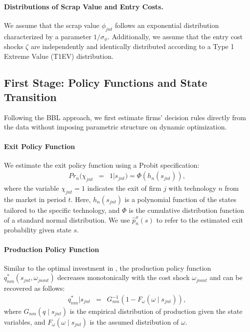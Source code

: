 \documentclass[12pt]{article}
\begin{document}
\paragraph{Distributions of Scrap Value and Entry Costs.} 
We assume that the scrap value $\phi_{jnt}$ follows an exponential distribution characterized by a parameter $1/\sigma_{\phi}$. %
Additionally, we assume that the entry cost shocks $\zeta$ are independently and identically distributed according to a Type 1 Extreme Value (T1EV) distribution.

\subsection{First Stage: Policy Functions and State Transition}
\label{subsec:est_dynamic_first}
Following the BBL approach, we first estimate firms’ decision rules directly from the data without imposing parametric structure on dynamic optimization.

\paragraph{Exit Policy Function} 
We estimate the exit policy function using a Probit specification:
\begin{eqnarray}
     Pr_n(\chi_{jnt} &=&1|s_{jnt})=\Phi(h_n(s_{jnt})), \label{eq:est_exit}
\end{eqnarray}
where the variable $\chi_{jnt}=1$ indicates the exit of firm $j$ with technology $n$ from the market in period $t$. Here, $h_n(s_{jnt})$ is a polynomial function of the states tailored to the specific technology, and $\Phi$ is the cumulative distribution function of a standard normal distribution. We use $\hat{p}^x_n(s)$ to refer to the estimated exit probability given state $s$.


\paragraph{Production Policy Function}
Similar to the optimal investment in \citet{bajari2007estimating}, the production policy function $q_{nm}^*(s_{jnt},\omega_{jnmt})$ decreases monotonically with the cost shock $\omega_{jnmt}$ and can be recovered as follows:
\begin{eqnarray}
q_{nm}^*|s_{jnt} &=& G_{nm}^{-1}(1-F_{\omega}(\omega\mid s_{jnt})), \label{eq:est_output_1}
\end{eqnarray}
where $G_{nm}(q\mid s_{jnt})$ is the empirical distribution of production given the state variables, and $F_{\omega}(\omega\mid s_{jnt})$ is the assumed distribution of $\omega$.
\end{document}
